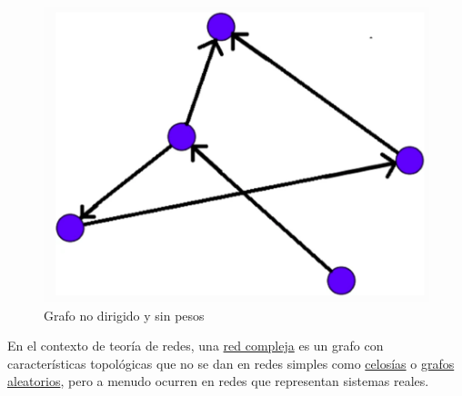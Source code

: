 \begin{figure}[h!]
    \centering
    \includegraphics[scale=0.5]{./img/grafo.png}
    \caption{Grafo no dirigido y sin pesos}
    \label{img:grafo1}
\end{figure}

\begin{definicion}\label{def:CN}
En el contexto de teoría de redes, una \href{https://en.wikipedia.org/wiki/Complex_network}{red compleja} 
es un grafo con características topológicas que no se dan 
en redes simples como \href{https://en.wikipedia.org/wiki/Lattice_(order)}{celosías} o 
\href{https://mathworld.wolfram.com/RandomGraph.html}{grafos aleatorios}, pero a menudo ocurren en redes que 
representan sistemas reales. 


\end{definicion}

